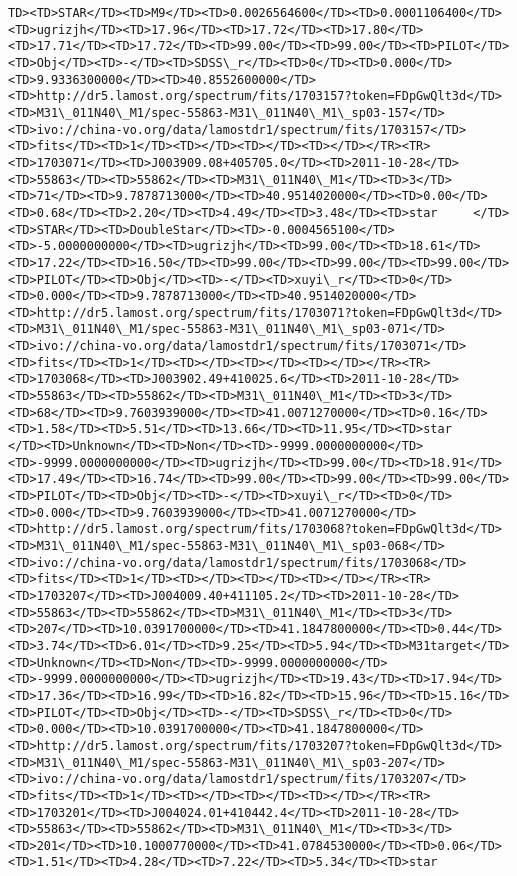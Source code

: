 \documentclass[11pt]{article}
\begin{document}
\begin{Verbatim}[commandchars=\\\{\}]
TD><TD>STAR</TD><TD>M9</TD><TD>0.0026564600</TD><TD>0.0001106400</TD><TD>ugrizjh</TD><TD>17.96</TD><TD>17.72</TD><TD>17.80</TD><TD>17.71</TD><TD>17.72</TD><TD>99.00</TD><TD>99.00</TD><TD>PILOT</TD><TD>Obj</TD><TD>-</TD><TD>SDSS\_r</TD><TD>0</TD><TD>0.000</TD><TD>9.9336300000</TD><TD>40.8552600000</TD><TD>http://dr5.lamost.org/spectrum/fits/1703157?token=FDpGwQlt3d</TD><TD>M31\_011N40\_M1/spec-55863-M31\_011N40\_M1\_sp03-157</TD><TD>ivo://china-vo.org/data/lamostdr1/spectrum/fits/1703157</TD><TD>fits</TD><TD>1</TD><TD></TD><TD></TD><TD></TD></TR><TR><TD>1703071</TD><TD>J003909.08+405705.0</TD><TD>2011-10-28</TD><TD>55863</TD><TD>55862</TD><TD>M31\_011N40\_M1</TD><TD>3</TD><TD>71</TD><TD>9.7878713000</TD><TD>40.9514020000</TD><TD>0.00</TD><TD>0.68</TD><TD>2.20</TD><TD>4.49</TD><TD>3.48</TD><TD>star     </TD><TD>STAR</TD><TD>DoubleStar</TD><TD>-0.0004565100</TD><TD>-5.0000000000</TD><TD>ugrizjh</TD><TD>99.00</TD><TD>18.61</TD><TD>17.22</TD><TD>16.50</TD><TD>99.00</TD><TD>99.00</TD><TD>99.00</TD><TD>PILOT</TD><TD>Obj</TD><TD>-</TD><TD>xuyi\_r</TD><TD>0</TD><TD>0.000</TD><TD>9.7878713000</TD><TD>40.9514020000</TD><TD>http://dr5.lamost.org/spectrum/fits/1703071?token=FDpGwQlt3d</TD><TD>M31\_011N40\_M1/spec-55863-M31\_011N40\_M1\_sp03-071</TD><TD>ivo://china-vo.org/data/lamostdr1/spectrum/fits/1703071</TD><TD>fits</TD><TD>1</TD><TD></TD><TD></TD><TD></TD></TR><TR><TD>1703068</TD><TD>J003902.49+410025.6</TD><TD>2011-10-28</TD><TD>55863</TD><TD>55862</TD><TD>M31\_011N40\_M1</TD><TD>3</TD><TD>68</TD><TD>9.7603939000</TD><TD>41.0071270000</TD><TD>0.16</TD><TD>1.58</TD><TD>5.51</TD><TD>13.66</TD><TD>11.95</TD><TD>star     </TD><TD>Unknown</TD><TD>Non</TD><TD>-9999.0000000000</TD><TD>-9999.0000000000</TD><TD>ugrizjh</TD><TD>99.00</TD><TD>18.91</TD><TD>17.49</TD><TD>16.74</TD><TD>99.00</TD><TD>99.00</TD><TD>99.00</TD><TD>PILOT</TD><TD>Obj</TD><TD>-</TD><TD>xuyi\_r</TD><TD>0</TD><TD>0.000</TD><TD>9.7603939000</TD><TD>41.0071270000</TD><TD>http://dr5.lamost.org/spectrum/fits/1703068?token=FDpGwQlt3d</TD><TD>M31\_011N40\_M1/spec-55863-M31\_011N40\_M1\_sp03-068</TD><TD>ivo://china-vo.org/data/lamostdr1/spectrum/fits/1703068</TD><TD>fits</TD><TD>1</TD><TD></TD><TD></TD><TD></TD></TR><TR><TD>1703207</TD><TD>J004009.40+411105.2</TD><TD>2011-10-28</TD><TD>55863</TD><TD>55862</TD><TD>M31\_011N40\_M1</TD><TD>3</TD><TD>207</TD><TD>10.0391700000</TD><TD>41.1847800000</TD><TD>0.44</TD><TD>3.74</TD><TD>6.01</TD><TD>9.25</TD><TD>5.94</TD><TD>M31target</TD><TD>Unknown</TD><TD>Non</TD><TD>-9999.0000000000</TD><TD>-9999.0000000000</TD><TD>ugrizjh</TD><TD>19.43</TD><TD>17.94</TD><TD>17.36</TD><TD>16.99</TD><TD>16.82</TD><TD>15.96</TD><TD>15.16</TD><TD>PILOT</TD><TD>Obj</TD><TD>-</TD><TD>SDSS\_r</TD><TD>0</TD><TD>0.000</TD><TD>10.0391700000</TD><TD>41.1847800000</TD><TD>http://dr5.lamost.org/spectrum/fits/1703207?token=FDpGwQlt3d</TD><TD>M31\_011N40\_M1/spec-55863-M31\_011N40\_M1\_sp03-207</TD><TD>ivo://china-vo.org/data/lamostdr1/spectrum/fits/1703207</TD><TD>fits</TD><TD>1</TD><TD></TD><TD></TD><TD></TD></TR><TR><TD>1703201</TD><TD>J004024.01+410442.4</TD><TD>2011-10-28</TD><TD>55863</TD><TD>55862</TD><TD>M31\_011N40\_M1</TD><TD>3</TD><TD>201</TD><TD>10.1000770000</TD><TD>41.0784530000</TD><TD>0.06</TD><TD>1.51</TD><TD>4.28</TD><TD>7.22</TD><TD>5.34</TD><TD>star     
\end{Verbatim}
\end{document}
